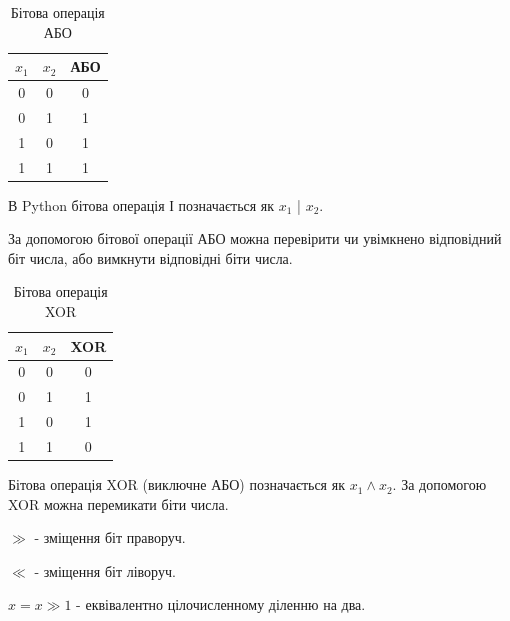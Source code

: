 \begin{frame}

\begin{table}
  \caption{Бітова операція АБО}
  \label{tab:}

  \begin{center}
    \begin{tabular}{|c|c|c|}
    \hline
      \textbf{$x_1$} & \textbf{$x_2$} &  \textbf{АБО} \\
    \hline
      0 & 0 & 0 \\
    \hline
      0 & 1 & 1 \\
    \hline
      1 & 0 & 1 \\
    \hline
      1 & 1 & 1 \\
    \hline
    \end{tabular}
  \end{center}
\end{table}


В Python бітова операція І позначається як $x_1$ | $x_2$.

За допомогою бітової операції АБО можна перевірити чи увімкнено відповідний біт числа, або вимкнути відповідні біти числа.

\end{frame}

\begin{frame}

\begin{table}
  \caption{Бітова операція XOR}
  \label{tab:}

  \begin{center}
    \begin{tabular}{|c|c|c|}
    \hline
      \textbf{$x_1$} & \textbf{$x_2$} &  \textbf{XOR} \\
    \hline
      0 & 0 & 0 \\
    \hline
      0 & 1 & 1 \\
    \hline
      1 & 0 & 1 \\
    \hline
      1 & 1 & 0 \\
    \hline
    \end{tabular}
  \end{center}
\end{table}

Бітова операція XOR (виключне АБО) позначається як $x_1 \wedge x_2$. За допомогою XOR можна перемикати біти числа.

\end{frame}

\begin{frame}

$\gg$ - зміщення біт праворуч.

$\ll$  - зміщення біт ліворуч.

$x = x \gg 1$ - еквівалентно цілочисленному діленню на два.

\end{frame}
